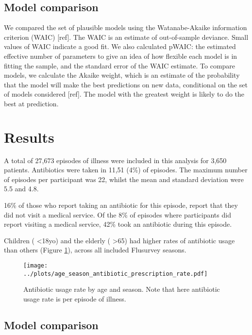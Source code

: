 \documentclass{article}
\begin{document}
\subsection{Model comparison}

We compared the set of plausible models using the Watanabe-Akaike information criterion (WAIC) [ref]. The WAIC is an estimate of out-of-sample deviance. Small values of WAIC indicate a good fit. We also calculated pWAIC: the estimated effective number of parameters to give an idea of how flexible each model is in fitting the sample, and the standard error of the WAIC estimate. To compare models, we calculate the Akaike weight, which is an estimate of the probability that the model will make the best predictions on new data, conditional on the set of models considered [ref]. The model with the greatest weight is likely to do the best at prediction.

\clearpage

\section{Results}

A total of 27,673 episodes of illness were included in this analysis for 3,650 patients. Antibiotics were taken in 11,51 (4\%) of episodes. The maximum number of episodes per participant was 22, whilst the mean and standard deviation were 5.5 and 4.8. 

16\% of those who report taking an antibiotic for this episode, report that they did not visit a medical service. Of the 8\% of episodes where participants did report visiting a medical service, 42\% took an antibiotic during this episode. 

Children ( \textless 18yo) and the elderly ( \textgreater 65) had higher rates of antibiotic usage than others (Figure \ref{fig:corr}), across all included Flusurvey seasons. 

\begin{figure}[htbp]
	\centering
	\texttt{[image: ../plots/age\_season\_antibiotic\_prescription\_rate.pdf]}
	\caption{Antibiotic usage rate by age and season. Note that here antibiotic usage rate is per episode of illness.}
	\label{fig:corr}
\end{figure}

\subsection{Model comparison}
\end{document}
